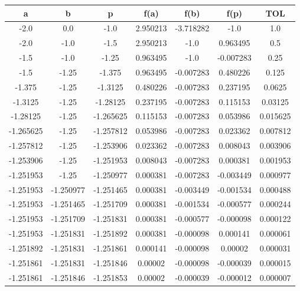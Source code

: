 \documentclass[12pt]{article}
\begin{document}
\begin{enumerate}
\begin{enumerate}[label=\alph*]
        \begin{tabular}{|c|c|c|c|c|c|c|}
            \hline
            \textbf{a} & \textbf{b} & \textbf{p} & \textbf{f(a)} & \textbf{f(b)} & \textbf{f(p)} & \textbf{TOL}\\ \hline
            -2.0 & 0.0 & -1.0 & 2.950213 & -3.718282 & -1.0 & 1.0 \\
            -2.0 & -1.0 & -1.5 & 2.950213 & -1.0 & 0.963495 & 0.5 \\
            -1.5 & -1.0 & -1.25 & 0.963495 & -1.0 & -0.007283 & 0.25 \\
            -1.5 & -1.25 & -1.375 & 0.963495 & -0.007283 & 0.480226 & 0.125 \\
            -1.375 & -1.25 & -1.3125 & 0.480226 & -0.007283 & 0.237195 & 0.0625 \\
            -1.3125 & -1.25 & -1.28125 & 0.237195 & -0.007283 & 0.115153 & 0.03125 \\
            -1.28125 & -1.25 & -1.265625 & 0.115153 & -0.007283 & 0.053986 & 0.015625 \\
            -1.265625 & -1.25 & -1.257812 & 0.053986 & -0.007283 & 0.023362 & 0.007812 \\
            -1.257812 & -1.25 & -1.253906 & 0.023362 & -0.007283 & 0.008043 & 0.003906 \\
            -1.253906 & -1.25 & -1.251953 & 0.008043 & -0.007283 & 0.000381 & 0.001953 \\
            -1.251953 & -1.25 & -1.250977 & 0.000381 & -0.007283 & -0.003449 & 0.000977 \\
            -1.251953 & -1.250977 & -1.251465 & 0.000381 & -0.003449 & -0.001534 & 0.000488 \\
            -1.251953 & -1.251465 & -1.251709 & 0.000381 & -0.001534 & -0.000577 & 0.000244 \\
            -1.251953 & -1.251709 & -1.251831 & 0.000381 & -0.000577 & -0.000098 & 0.000122 \\
            -1.251953 & -1.251831 & -1.251892 & 0.000381 & -0.000098 & 0.000141 & 0.000061 \\
            -1.251892 & -1.251831 & -1.251861 & 0.000141 & -0.000098 & 0.00002 & 0.000031 \\
            -1.251861 & -1.251831 & -1.251846 & 0.00002 & -0.000098 & -0.000039 & 0.000015 \\
            -1.251861 & -1.251846 & -1.251853 & 0.00002 & -0.000039 & -0.000012 & 0.000007 \\
            \hline
        \end{tabular}
    \end{enumerate}



\end{enumerate}
\end{document}
